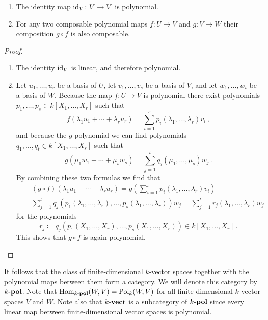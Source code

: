 \begin{lemma}
  \leavevmode
  \begin{enumerate}
    \item
      The identity map $\operatorname{id}_V \colon V \to V$ is polynomial.
    \item
      For any two composable polynomial maps $f \colon U \to V$ and $g \colon V \to W$ their composition $g \circ f$ is also composable.
  \end{enumerate}
\end{lemma}
\begin{proof}
  \leavevmode
  \begin{enumerate}
    \item
      The identity $\operatorname{id}_V$ is linear, and therefore polynomial.
    \item
      Let $u_1, \dotsc, u_r$ be a basis of $U$, let $v_1, \dotsc, v_s$ be a basis of $V$, and let $w_1, \dotsc, w_t$ be a basis of $W$.
      Because the map $f \colon U \to V$ is polynomial there exist polynomials $p_1, \dotsc, p_s \in k[X_1, \dotsc, X_r]$ such that
      \[
          f( \lambda_1 u_1 + \dotsb + \lambda_r u_r )
        = \sum_{i=1}^s p_i(\lambda_1, \dotsc, \lambda_r) v_i \,,
      \]
      and because  the $g$ polynomial we can find polynomials $q_1, \dotsc, q_t \in k[X_1, \dotsc, X_s]$ such that
      \[
          g( \mu_1 w_1 + \dotsb + \mu_s w_s )
        = \sum_{j=1}^t q_j(\mu_1, \dotsc, \mu_s) w_j \,.
      \]
      By combining these two formulas we find that
      \begin{align*}
         &\,  (g \circ f)( \lambda_1 u_1 + \dotsb + \lambda_r u_r)
        =     g
              \left(
                \sum_{i=1}^s p_i(\lambda_1, \dotsc, \lambda_r) v_i
              \right) \\
        =&\,  \sum_{j=1}^t
              q_j
              (
              p_1(\lambda_1, \dotsc, \lambda_r),
              \dotsc,
              p_s(\lambda_1, \dotsc, \lambda_r)
              )
              w_j
        =  \sum_{j=1}^t r_j(\lambda_1, \dotsc, \lambda_r) w_j
      \end{align*}
      for the polynomials
      \[
                  r_j
        \coloneqq q_j(p_1(X_1, \dotsc, X_r), \dotsc, p_s(X_1, \dotsc, X_r))
        \in       k[X_1, \dotsc, X_r] \,.
      \]
      This shows that $g \circ f$ is again polynomial.
  \qedhere
  \end{enumerate}
\end{proof}


\begin{remark}
  \label{remark: category of polynomial vector spaces}
  It follows that the class of finite-dimensional $k$-vector spaces together with the polynomial maps between them form a category.
  We will denote this category by $k\text{-}\mathbf{pol}$.
  Note that $\operatorname{Hom}_{k\text{-}\mathbf{pol}}(W,V) = \operatorname{Pol}_k(W,V)$ for all finite-dimensional $k$-vector spaces $V$ and $W$.
  Note also that $k\text{-}\mathbf{vect}$ is a subcategory of $k\text{-}\mathbf{pol}$ since every linear map between finite-dimensional vector spaces is polynomial.
\end{remark}


